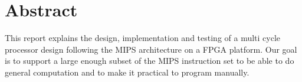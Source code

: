 \section*{Abstract}

This report explains the design, implementation and testing of a multi cycle processor design following the MIPS architecture on a FPGA platform. Our goal is to support a large enough subset of the MIPS instruction set to be able to do general computation and to make it practical to program manually.

